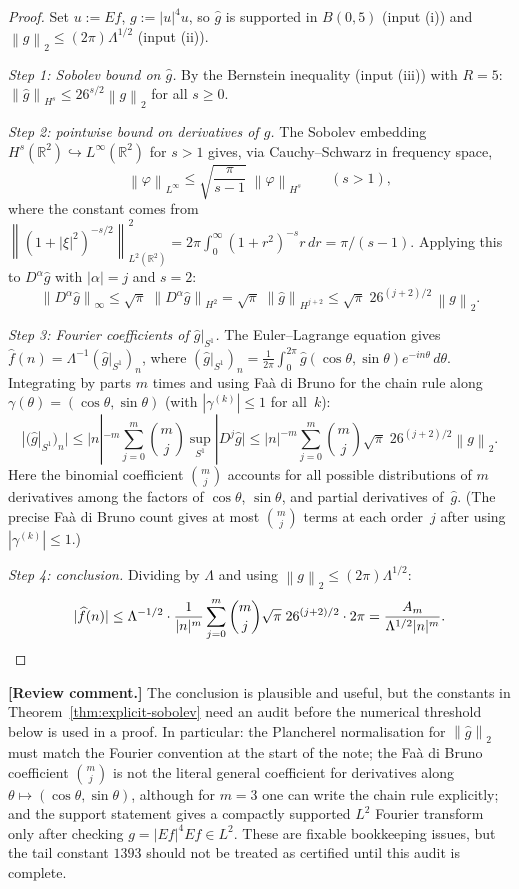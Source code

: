 \documentclass[12pt]{article}
\theoremstyle{definition}
\theoremstyle{remark}
\newcommand{\R}{\mathbb{R}}
\newcommand{\wh}{\widehat}
\newcommand{\norm}[1]{\left\|#1\right\|}
\newcommand{\review}[1]{\par\smallskip\noindent\textbf{\color{red}[Review comment.]} {\color{red}#1}\par\smallskip}
\begin{document}
\begin{proof}
  Set $u:=Ef$, $g:=|u|^4u$, so $\wh g$ is supported in $B(0,5)$
  (input (i)) and $\norm{g}_2\leq(2\pi)\Lambda^{1/2}$ (input (ii)).

  \emph{Step 1: Sobolev bound on $\wh g$.}
  By the Bernstein inequality (input (iii)) with $R=5$:
  $\norm{\wh g}_{H^s}\leq 26^{s/2}\norm{g}_2$ for all $s\geq 0$.

  \emph{Step 2: pointwise bound on derivatives of $\wh g$.}
  The Sobolev embedding $H^{s}(\R^2)\hookrightarrow L^\infty(\R^2)$
  for $s>1$ gives, via Cauchy--Schwarz in frequency space,
  \[
    \norm{\varphi}_{L^\infty}
    \leq\sqrt{\frac{\pi}{s-1}}\;\norm{\varphi}_{H^s}
    \qquad(s>1),
  \]
  where the constant comes from
  $\norm{(1+|\xi|^2)^{-s/2}}_{L^2(\R^2)}^2
  =2\pi\int_0^\infty(1+r^2)^{-s}r\,dr=\pi/(s-1)$.
  Applying this to $D^\alpha\wh g$ with $|\alpha|=j$ and
  $s=2$:
  \[
    \norm{D^\alpha\wh g}_\infty
    \leq\sqrt{\pi}\;\norm{D^\alpha\wh g}_{H^2}
    =\sqrt{\pi}\;\norm{\wh g}_{H^{j+2}}
    \leq\sqrt{\pi}\;26^{(j+2)/2}\,\norm{g}_2.
  \]

  \emph{Step 3: Fourier coefficients of $\wh g|_{S^1}$.}
  The Euler--Lagrange equation gives $\wh f(n)=\Lambda^{-1}
  (\wh g|_{S^1})_n$, where $(\wh g|_{S^1})_n=
  \frac{1}{2\pi}\int_0^{2\pi}\wh g(\cos\theta,\sin\theta)
  e^{-in\theta}\,d\theta$.  Integrating by parts $m$ times and using
  Fa\`a di Bruno for the chain rule along $\gamma(\theta)
  =(\cos\theta,\sin\theta)$ (with $|\gamma^{(k)}|\leq 1$ for all~$k$):
  \[
    |(\wh g|_{S^1})_n|
    \leq|n|^{-m}\sum_{j=0}^{m}\binom{m}{j}
      \sup_{S^1}|D^j\wh g|
    \leq|n|^{-m}\sum_{j=0}^{m}\binom{m}{j}
      \sqrt{\pi}\;26^{(j+2)/2}\norm{g}_2.
  \]
  Here the binomial coefficient $\binom{m}{j}$ accounts for all
  possible distributions of $m$ derivatives among the factors of
  $\cos\theta$, $\sin\theta$, and partial derivatives of~$\wh g$.
  (The precise Fa\`a di Bruno count gives at most $\binom{m}{j}$
  terms at each order~$j$ after using $|\gamma^{(k)}|\leq 1$.)

  \emph{Step 4: conclusion.}
  Dividing by $\Lambda$ and using $\norm{g}_2\leq(2\pi)\Lambda^{1/2}$:
  \[
    |\wh f(n)|
    \leq\Lambda^{-1/2}\cdot
    \frac{1}{|n|^m}
    \sum_{j=0}^{m}\binom{m}{j}
    \sqrt{\pi}\;26^{(j+2)/2}\cdot 2\pi
    =\frac{A_m}{\Lambda^{1/2}|n|^m}.\qedhere
  \]
\end{proof}

\review{The conclusion is plausible and useful, but the constants in
Theorem~\ref{thm:explicit-sobolev} need an audit before the numerical
threshold below is used in a proof.  In particular: the Plancherel
normalisation for $\norm{\wh g}_{2}$ must match the Fourier convention at
the start of the note; the Fa\`a di Bruno coefficient
$\binom mj$ is not the literal general coefficient for derivatives along
$\theta\mapsto(\cos\theta,\sin\theta)$, although for $m=3$ one can write
the chain rule explicitly; and the support statement gives a compactly
supported $L^2$ Fourier transform only after checking $g=|Ef|^4Ef\in L^2$.
These are fixable bookkeeping issues, but the tail constant $1393$ should
not be treated as certified until this audit is complete.}
\end{document}
